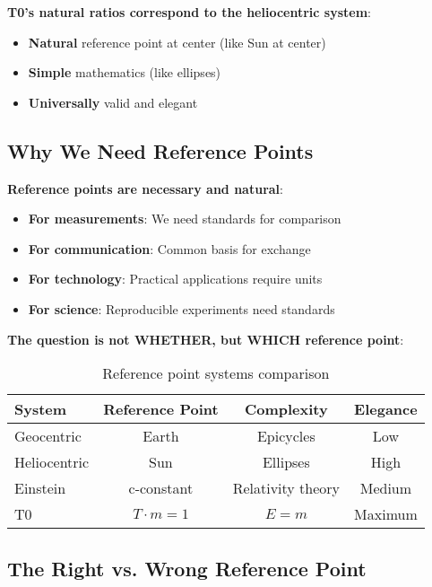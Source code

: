 \documentclass[12pt,a4paper]{article}
\newcommand{\Tfield}{T}
\begin{document}
	\textbf{T0's natural ratios correspond to the heliocentric system}:
	\begin{itemize}
		\item \textbf{Natural} reference point at center (like Sun at center)
		\item \textbf{Simple} mathematics (like ellipses)
		\item \textbf{Universally} valid and elegant
	\end{itemize}
	
	\subsection{Why We Need Reference Points}
	
	\textbf{Reference points are necessary and natural}:
	\begin{itemize}
		\item \textbf{For measurements}: We need standards for comparison
		\item \textbf{For communication}: Common basis for exchange
		\item \textbf{For technology}: Practical applications require units
		\item \textbf{For science}: Reproducible experiments need standards
	\end{itemize}
	
	\textbf{The question is not WHETHER, but WHICH reference point}:
	
	\begin{table}[htbp]
		\centering
		\begin{tabular}{|l|c|c|c|}
			\hline
			\textbf{System} & \textbf{Reference Point} & \textbf{Complexity} & \textbf{Elegance} \\
			\hline
			Geocentric & Earth & Epicycles & Low \\
			Heliocentric & Sun & Ellipses & High \\
			Einstein & c-constant & Relativity theory & Medium \\
			T0 & $\Tfield \cdot m = 1$ & $E = m$ & Maximum \\
			\hline
		\end{tabular}
		\caption{Reference point systems comparison}
	\end{table}
	
	\subsection{The Right vs. Wrong Reference Point}
	
\end{document}
